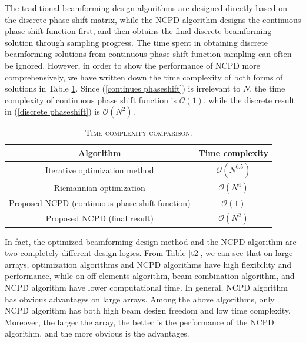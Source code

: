 \documentclass[12pt,draftclsnofoot,onecolumn]{IEEEtran}
\begin{document}
		The traditional beamforming design algorithms are designed directly based on the discrete phase shift matrix, while the NCPD algorithm designs the continuous phase shift function first, and then obtains the final discrete beamforming solution through sampling progress.  The time spent in obtaining discrete beamforming solutions from continuous phase shift function sampling can often be ignored. However, in order to show the performance of NCPD more comprehensively, we have written down the time complexity of both forms of solutions in Table \ref{t1}. Since (\ref{continues phaseshift}) is irrelevant to $N$, the time complexity of continuous phase shift function is $\mathcal{O}(1)$, while the discrete  result in (\ref{discrete phaseshift}) is $\mathcal{O}(N^2)$. 
		\begin{table}
			\centering
			\caption{\textsc{Time complexity comparison.}}
			\begin{tabular}{|c|c|} 
				\hline 
				Algorithm  & Time complexity  \\
				\hline
				Iterative optimization method \cite{DBLP:journals/wcl/MaZZ22} & $\mathcal{O}(N^{6.5})$  \\
				\hline
				Riemannian optimization \cite{DBLP:journals/wcl/FanZH19}& $\mathcal{O}(N^4)$ \\
				\hline
				Proposed NCPD (continuous phase shift function) & $\mathcal{O}(1)$ \\
				\hline
				Proposed NCPD (final result) & $\mathcal{O}(N^2)$ \\
				\hline
			\end{tabular}
			\label{t1}
		\end{table}
		
		In fact, the optimized beamforming design method and the NCPD algorithm are two completely different design logics. From Table \ref{t2}, we can see that on large arrays, optimization algorithms and NCPD algorithms have high flexibility and performance, while on-off elements algorithm, beam combination algorithm, and NCPD algorithm have lower computational time. In general, NCPD algorithm  has obvious advantages on large arrays. Among the above algorithms, only NCPD algorithm  has both high beam design freedom and low time complexity. Moreover, the larger the array, the better is the performance of the NCPD algorithm, and the more obvious is the advantages.
	
\end{document}

